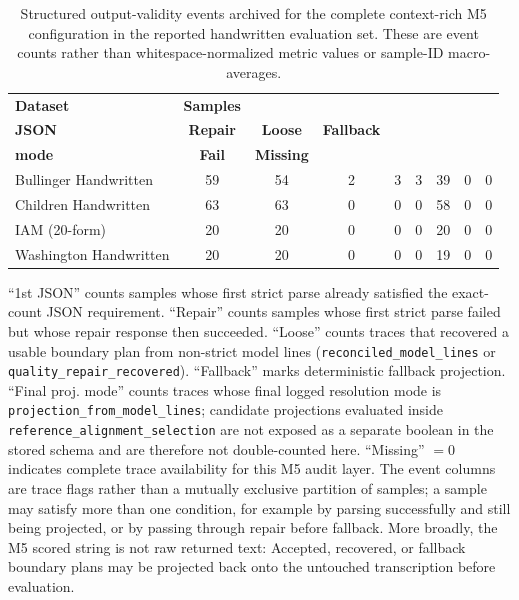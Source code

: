 \begin{table}[H]
  \centering
  \caption{Structured output-validity events archived for the complete \GPTFiveShort{} context-rich M5 configuration in the reported handwritten evaluation set. These are event counts rather than whitespace-normalized metric values or sample-ID macro-averages.}
  \label{tab:app_m5_trace_event_counts}
  \footnotesize
  \renewcommand{\arraystretch}{1.08}
  \begin{tabular}{@{}l c c c c c c c c@{}}
    \toprule
    \textbf{Dataset} & \textbf{Samples} & \shortstack{\textbf{1st}\\\textbf{JSON}} & \textbf{Repair} & \textbf{Loose} & \textbf{Fallback} & \shortstack{\textbf{Final proj.}\\\textbf{mode}} & \textbf{Fail} & \textbf{Missing} \\
    \midrule
    Bullinger Handwritten & 59 & 54 & 2 & 3 & 3 & 39 & 0 & 0 \\
    Children Handwritten & 63 & 63 & 0 & 0 & 0 & 58 & 0 & 0 \\
    IAM (20-form) & 20 & 20 & 0 & 0 & 0 & 20 & 0 & 0 \\
    Washington Handwritten & 20 & 20 & 0 & 0 & 0 & 19 & 0 & 0 \\
    \bottomrule
  \end{tabular}
  \vspace{0.35em}

  \parbox{0.88\linewidth}{\footnotesize\raggedright ``1st JSON'' counts samples whose first strict parse already satisfied the exact-count JSON requirement. ``Repair'' counts samples whose first strict parse failed but whose repair response then succeeded. ``Loose'' counts traces that recovered a usable boundary plan from non-strict model lines (\texttt{reconciled\_model\_lines} or \texttt{quality\_repair\_recovered}). ``Fallback'' marks deterministic fallback projection. ``Final proj. mode'' counts traces whose final logged resolution mode is \texttt{projection\_from\_model\_lines}; candidate projections evaluated inside \texttt{reference\_alignment\_selection} are not exposed as a separate boolean in the stored schema and are therefore not double-counted here. ``Missing'' \(=0\) indicates complete trace availability for this M5 audit layer. The event columns are trace flags rather than a mutually exclusive partition of samples; a sample may satisfy more than one condition, for example by parsing successfully and still being projected, or by passing through repair before fallback. More broadly, the M5 scored string is not raw returned text: Accepted, recovered, or fallback boundary plans may be projected back onto the untouched transcription before evaluation.}
\end{table}
\FloatBarrier

